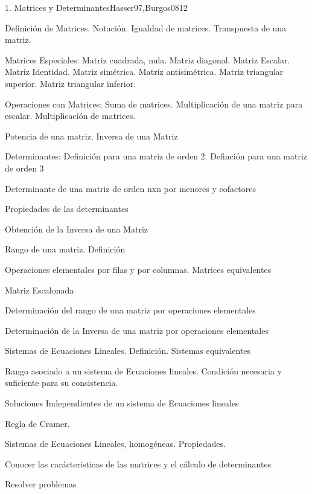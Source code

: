 \begin{syllabus}
\begin{unit}{1. Matrices y Determinantes}{Hasser97,Burgos08}{12}
\begin{topics}
      \item Definición de Matrices. Notación. Igualdad de matrices. Transpuesta de una matriz.
      \item Matrices Especiales: Matriz cuadrada, nula. Matriz diagonal. Matriz  Escalar. Matriz Identidad. Matriz simétrica. Matriz antisimétrica. Matriz  triangular superior. Matriz triangular inferior.
      \item Operaciones con Matrices; Suma de matrices. Multiplicación de una matriz para escalar. Multiplicación de matrices.
	\item Potencia de una matriz. Inversa de una Matriz
	\item Determinantes: Definición para una matriz de orden 2. Definción para una matriz de orden 3
	\item Determinante de una matriz de orden nxn por menores y cofactores
	\item Propiedades de las determinantes
	\item Obtención de la Inversa de una Matriz
	\item Rango de una matriz. Definición
	\item Operaciones elementales por filas y por columnas. Matrices equivalentes
	\item Matriz Escalonada
	\item Determinación del rango de una matriz por operaciones elementales
	\item Determinación de la Inversa de una matriz por operaciones elementales
	\item Sistemas de Ecuaciones Lineales. Definición. Sistemas equivalentes
	\item Rango asociado a un sistema de Ecuaciones lineales. Condición necesaria y suficiente para su consistencia.
	\item Soluciones Independientes de un sistema de Ecuaciones lineales
	\item Regla de Cramer.
	\item Sistemas de Ecuaciones Lineales, homogéneas. Propiedades.
   \end{topics}

   \begin{learningoutcomes}
      \item Conocer las carácteristicas de las matrices y el cálculo de determinantes
	\item Resolver problemas
   \end{learningoutcomes}
\end{unit}


\end{syllabus}

